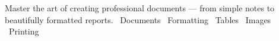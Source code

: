   {Master the art of creating professional documents --- from simple notes to beautifully formatted reports.}
  {\faFileWord\ Documents \quad \faFont\ Formatting \quad \faTable\ Tables \quad \faImage\ Images \quad \faPrint\ Printing}
